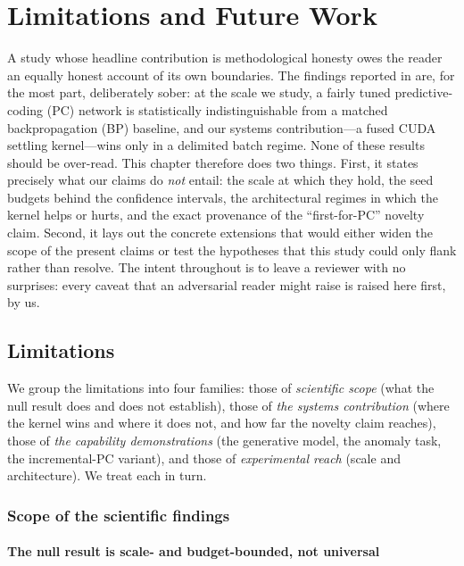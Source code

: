 \chapter{Limitations and Future Work}\label{ch:limitations}

A study whose headline contribution is methodological honesty owes the reader an
equally honest account of its own boundaries. The findings reported in
 are, for the most part, deliberately sober: at the scale we
study, a fairly tuned predictive-coding (PC) network is statistically
indistinguishable from a matched backpropagation (BP) baseline, and our systems
contribution---a fused CUDA settling kernel---wins only in a delimited batch regime.
None of these results should be over-read. This chapter therefore does two things.
First, it states precisely what our claims do \emph{not} entail: the scale at which
they hold, the seed budgets behind the confidence intervals, the architectural
regimes in which the kernel helps or hurts, and the exact provenance of the
``first-for-PC'' novelty claim. Second, it lays out the concrete extensions that
would either widen the scope of the present claims or test the hypotheses that this
study could only flank rather than resolve. The intent throughout is to leave a
reviewer with no surprises: every caveat that an adversarial reader might raise is
raised here first, by us.

\section{Limitations}

We group the limitations into four families: those of \emph{scientific scope} (what
the null result does and does not establish), those of \emph{the systems
contribution} (where the kernel wins and where it does not, and how far the novelty
claim reaches), those of \emph{the capability demonstrations} (the generative model,
the anomaly task, the incremental-PC variant), and those of \emph{experimental
reach} (scale and architecture). We treat each in turn.

\subsection{Scope of the scientific findings}

\subsubsection{The null result is scale- and budget-bounded, not universal}

